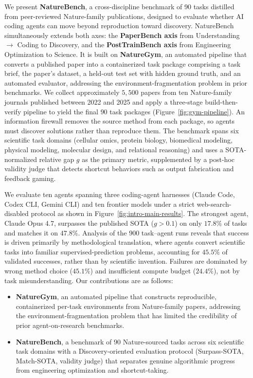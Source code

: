 \documentclass{llmxive}
\providecommand{\benchmark}{{\fontfamily{ppl}\selectfont NatureBench}\xspace}
\begin{document}
We present \textbf{\benchmark}, a cross-discipline benchmark of 90 tasks distilled from peer-reviewed Nature-family publications, designed to evaluate whether AI coding agents can move beyond reproduction toward discovery.
\benchmark simultaneously extends both axes: the \textbf{PaperBench axis} from Understanding $\to$ Coding to Discovery, and the \textbf{PostTrainBench axis} from Engineering Optimization to Science.
It is built on \textbf{NatureGym}, an automated pipeline that converts a published paper into a containerized task package comprising a task brief, the paper's dataset, a held-out test set with hidden ground truth, and an automated evaluator, addressing the environment-fragmentation problem in prior benchmarks.
We collect approximately $5{,}500$ papers from ten Nature-family journals published between 2022 and 2025 and apply a three-stage build-then-verify pipeline to yield the final $90$ task packages (Figure~\ref{fig:gym-pipeline}).
An information firewall removes the source method from each package, so agents must discover solutions rather than reproduce them.
The benchmark spans six scientific task domains (cellular omics, protein biology, biomedical modeling, physical modeling, molecular design, and relational reasoning) and uses a SOTA-normalized relative gap $g$ as the primary metric, supplemented by a post-hoc validity judge that detects shortcut behaviors such as output fabrication and feedback gaming.

We evaluate ten agents spanning three coding-agent harnesses (Claude Code, Codex CLI, Gemini CLI) and ten frontier models under a strict web-search-disabled protocol as shown in Figure~\ref{fig:intro-main-results}.
The strongest agent, Claude Opus 4.7, surpasses the published SOTA ($g > 0.1$) on only $17.8\%$ of tasks and matches it on $47.8\%$.
Analysis of the $900$ task--agent runs reveals that success is driven primarily by methodological translation, where agents convert scientific tasks into familiar supervised-prediction problems, accounting for $45.5\%$ of validated successes, rather than by scientific invention.
Failures are dominated by wrong method choice ($45.1\%$) and insufficient compute budget ($24.4\%$), not by task misunderstanding.
Our contributions are as follows:
\begin{itemize}[leftmargin=1em, itemsep=2pt, topsep=4pt]
    \item \textbf{NatureGym}, an automated pipeline that constructs reproducible, containerized per-task environments from Nature-family papers, addressing the environment-fragmentation problem that has limited the credibility of prior agent-on-research benchmarks.
    \item \textbf{NatureBench}, a benchmark of $90$ Nature-sourced tasks across six scientific task domains with a Discovery-oriented evaluation protocol (Surpass-SOTA, Match-SOTA, validity judge) that separates genuine algorithmic progress from engineering optimization and shortcut-taking.
\end{itemize}
\end{document}
